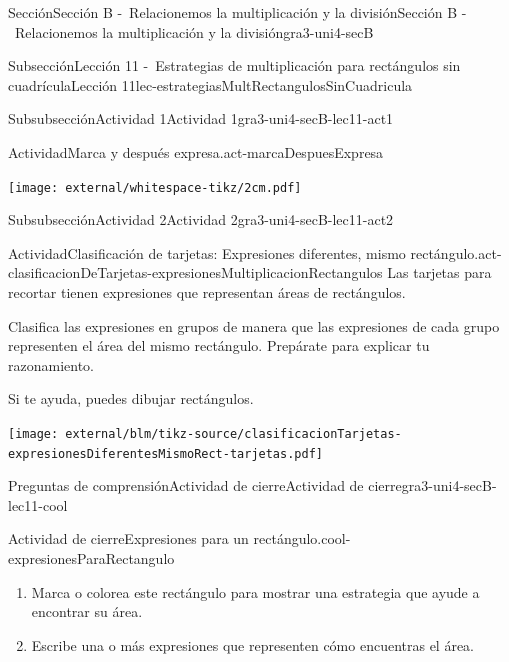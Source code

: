 \begin{sectionptx}{Sección}{Sección B -~Relacionemos la multiplicación y la división}{}{Sección B -~Relacionemos la multiplicación y la división}{}{}{gra3-uni4-secB}
\begin{subsectionptx}{Subsección}{Lección 11 -~Estrategias de multiplicación para rectángulos sin cuadrícula}{}{Lección 11}{}{}{lec-estrategiasMultRectangulosSinCuadricula}
\begin{subsubsectionptx}{Subsubsección}{Actividad 1}{}{Actividad 1}{}{}{gra3-uni4-secB-lec11-act1}
\begin{activity}{Actividad}{Marca y después expresa.}{act-marcaDespuesExpresa}
\begin{image}{0}{1}{0}{}
\texttt{[image: external/whitespace-tikz/2cm.pdf]}
\end{image}%
\end{activity}%
\end{subsubsectionptx}
%
%
\typeout{************************************************}
\typeout{************************************************}
%
\clearpage
\begin{subsubsectionptx}{Subsubsección}{Actividad 2}{}{Actividad 2}{}{}{gra3-uni4-secB-lec11-act2}
\begin{activity}{Actividad}{Clasificación de tarjetas: Expresiones diferentes, mismo rectángulo.}{act-clasificacionDeTarjetas-expresionesMultiplicacionRectangulos}%
Las tarjetas para recortar tienen expresiones que representan áreas de rectángulos.%
\par
Clasifica las expresiones en grupos de manera que las expresiones de cada grupo representen el área del mismo rectángulo. Prepárate para explicar tu razonamiento.%
\par
Si te ayuda, puedes dibujar rectángulos.%
\end{activity}%
\begin{cutoutpage}
\begin{image}{0}{1}{0}{}%
\texttt{[image: external/blm/tikz-source/clasificacionTarjetas-expresionesDiferentesMismoRect-tarjetas.pdf]}
\end{image}
\end{cutoutpage}
\end{subsubsectionptx}
%
%
\typeout{************************************************}
\typeout{************************************************}
%
\begin{reading-questions-subsubsection}{Preguntas de comprensión}{Actividad de cierre}{}{Actividad de cierre}{}{}{gra3-uni4-secB-lec11-cool}
\begin{project}{Actividad de cierre}{Expresiones para un rectángulo.}{cool-expresionesParaRectangulo}%
\begin{sidebyside}{2}{0}{0}{0}%
\begin{sbspanel}{0.6}%
%
\begin{enumerate}[label={(\alph*)}]
\item{}Marca o colorea este rectángulo para mostrar una estrategia que ayude a encontrar su área.%
\item{}Escribe una o más expresiones que representen cómo encuentras el área.%

\end{enumerate}
\end{sbspanel}
\end{sidebyside}
\end{project}
\end{reading-questions-subsubsection}
\end{subsectionptx}
\end{sectionptx}
